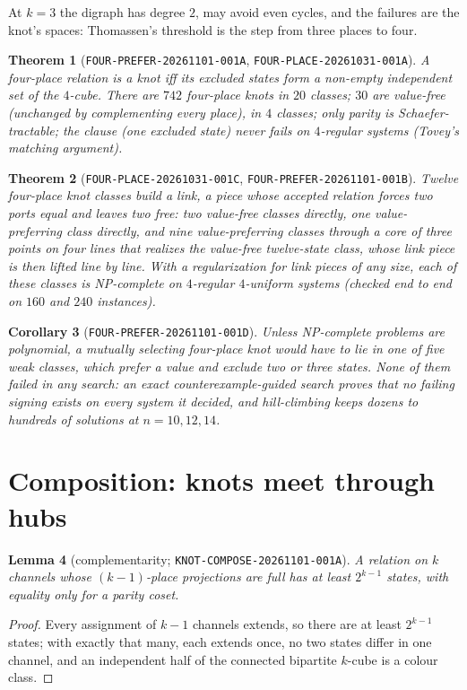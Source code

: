 \documentclass[11pt]{article}
\newtheorem{theorem}{Theorem}
\newtheorem{lemma}[theorem]{Lemma}
\newtheorem{corollary}[theorem]{Corollary}
\theoremstyle{definition}
\begin{document}
At $k=3$ the digraph has degree $2$, may avoid even cycles, and the failures are the knot's spaces: Thomassen's threshold is the step from
three places to four.

\begin{theorem}[\texttt{FOUR-PREFER-20261101-001A}, \texttt{FOUR-PLACE-20261031-001A}]\label{thm:catalogue}
A four-place relation is a knot iff its excluded states form a non-empty independent set of the $4$-cube. There are $742$ four-place knots
in $20$ classes; $30$ are value-free (unchanged by complementing every place), in $4$ classes; only parity is Schaefer-tractable; the
clause (one excluded state) never fails on $4$-regular systems (Tovey's matching argument).
\end{theorem}

\begin{theorem}[\texttt{FOUR-PLACE-20261031-001C}, \texttt{FOUR-PREFER-20261101-001B}]\label{thm:links}
Twelve four-place knot classes build a link, a piece whose accepted relation forces two ports equal and leaves two free: two value-free
classes directly, one value-preferring class directly, and nine value-preferring classes through a core of three points on four lines
that realizes the value-free twelve-state class, whose link piece is then lifted line by line. With a regularization for link pieces of any
size, each of these classes is NP-complete on $4$-regular $4$-uniform systems (checked end to end on $160$ and $240$ instances).
\end{theorem}

\begin{corollary}[\texttt{FOUR-PREFER-20261101-001D}]\label{cor:four}
Unless NP-complete problems are polynomial, a mutually selecting four-place knot would have to lie in one of five weak classes, which
prefer a value and exclude two or three states. None of them failed in any search: an exact counterexample-guided search proves that no
failing signing exists on every system it decided, and hill-climbing keeps dozens to hundreds of solutions at $n=10,12,14$.
\end{corollary}

\section{Composition: knots meet through hubs}\label{sec:compose}

\begin{lemma}[complementarity; \texttt{KNOT-COMPOSE-20261101-001A}]\label{lem:comp}
A relation on $k$ channels whose $(k-1)$-place projections are full has at least $2^{k-1}$ states, with equality only for a parity coset.
\end{lemma}
\begin{proof}
Every assignment of $k-1$ channels extends, so there are at least $2^{k-1}$ states; with exactly that many, each extends once, no two
states differ in one channel, and an independent half of the connected bipartite $k$-cube is a colour class.
\end{proof}
\end{document}
